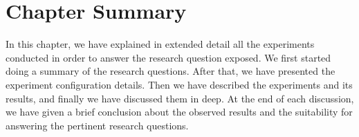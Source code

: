 \section{Chapter Summary}
In this chapter, we have explained in extended detail all the experiments conducted in order to answer the research question exposed.
We first started doing a summary of the research questions. After that, we have presented the experiment configuration details.
Then we have described the experiments and its results, and finally we have discussed them in deep. At the end of each discussion, we have given a brief conclusion about the observed results and the suitability for answering the pertinent research questions.
